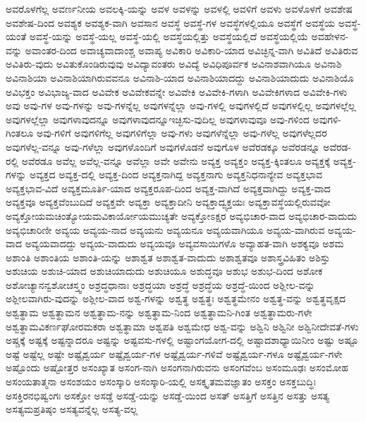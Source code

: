 {ಅವರೊಳಗೆಲ್ಲ
ಅವರ್ಣನೀಯ
ಅವಲಕ್ಕಿ-ಯನ್ನು
ಅವಳ
ಅವಳನ್ನು
ಅವಳಲ್ಲಿ
ಅವಳಿಗೆ
ಅವಳು
ಅವಳೊಳಗೆ
ಅವಶೇಷ
ಅವಶೇಷ-ದಿಂದ
ಅವಶ್ಯಕ
ಅವಶ್ಯಕ-ವಾಗಿ
ಅವಸಾನ
ಅವಸ್ಥೆ
ಅವಸ್ಥೆ-ಗಳ
ಅವಸ್ಥೆಗಳಲ್ಲಿಯೂ
ಅವಸ್ಥೆಗೆ
ಅವಸ್ಥೆಯ
ಅವಸ್ಥೆ-ಯಂತೆ
ಅವಸ್ಥೆ-ಯನ್ನು
ಅವಸ್ಥೆ-ಯಲ್ಲ
ಅವಸ್ಥೆ-ಯಲ್ಲಿ
ಅವಸ್ಥೆಯಲ್ಲಿತ್ತು
ಅವಸ್ಥೆಯಲ್ಲಿದೆ
ಅವಸ್ಥೆಯಲ್ಲಿಯೆ
ಅವಹೇಳನ-ವನ್ನು
ಅವಾಂತರ-ದಿಂದ
ಅವಾಚ್ಯವಾದಾಂಶ್ಚ
ಅವಾಪ್ಯ
ಅವಿಕಾರಿ
ಅವಿಕಾರಿ-ಯಾದ
ಅವಿಚ್ಛಿನ್ನ-ವಾಗಿ
ಅವಿತಿದೆ
ಅವಿತಿರುವ
ಅವಿತಿರು-ವುದು
ಅವಿತುಕೊಂಡಿರುವುವು
ಅವಿದ್ಯಾವಂತರು
ಅವಿದ್ಯೆ
ಅವಿಧಿಪೂರ್ವಕ
ಅವಿನಾಶವಾಗಿಯೂ
ಅವಿನಾಶಿ
ಅವಿನಾಶಿಯಾ
ಅವಿನಾಶಿಯಾಗಿರುವವನೂ
ಅವಿನಾಶಿ-ಯಾದ
ಅವಿನಾಶಿಯಾದದ್ದು
ಅವಿನಾಶಿಯಾದುದು
ಅವಿನಾಶಿಯೊ
ಅವಿಭಕ್ತಂ
ಅವಿಭಾಜ್ಯ-ವಾದ
ಅವಿವೇಕ
ಅವಿವೇಕವನ್ನೇ
ಅವಿವೇಕಿ
ಅವಿವೇಕಿ-ಗಳಾಗಿ
ಅವಿವೇಕಿಗಳಾದ
ಅವಿವೇಕಿ-ಗಳು
ಅವು
ಅವು-ಗಳ
ಅವು-ಗಳನ್ನು
ಅವು-ಗಳನ್ನೆಲ್ಲ
ಅವುಗಳನ್ನೆಲ್ಲಾ
ಅವು-ಗಳಲ್ಲಿ
ಅವುಗಳಲ್ಲಿದೆ
ಅವುಗಳಲ್ಲಿಲ್ಲ
ಅವುಗಳಲ್ಲೆಲ್ಲ
ಅವುಗಳಲ್ಲೆಲ್ಲಾ
ಅವುಗಳಾವುದನ್ನೂ
ಅವುಗಳಾವುದನ್ನೂಇಚ್ಛಿಸು-ವುದಿಲ್ಲ
ಅವುಗಳಾವುವೂ
ಅವು-ಗಳಿಂದ
ಅವುಗಳಿ-ಗಿಂತಲೂ
ಅವು-ಗಳಿಗೆ
ಅವುಗಳಿಗೆಲ್ಲ
ಅವುಗಳಿಗೆಲ್ಲಾ
ಅವು-ಗಳು
ಅವುಗಳೆನ್ನೆಲ್ಲಾ
ಅವು-ಗಳೆಲ್ಲ
ಅವುಗಳೆಲ್ಲದರ
ಅವುಗಳೆಲ್ಲ-ವನ್ನೂ
ಅವು-ಗಳೆಲ್ಲಾ
ಅವುಗಳೊಂದಿಗೆ
ಅವುಗಳೊಡನೆ
ಅವುಗೊಳ
ಅವೆರಡಕ್ಕೂ
ಅವೆರಡನ್ನೂ
ಅವೆರಡ-ರಲ್ಲಿ
ಅವೆರಡೂ
ಅವೆಲ್ಲ
ಅವೆಲ್ಲ-ವನ್ನೂ
ಅವೆಲ್ಲಾ
ಅವೇ
ಅವೇನು
ಅವ್ಯಕ್ತ
ಅವ್ಯಕ್ತಂ
ಅವ್ಯಕ್ತ-ಕ್ಕಿಂತಲೂ
ಅವ್ಯಕ್ತಕ್ಕೆ
ಅವ್ಯಕ್ತ-ಗಳನ್ನು
ಅವ್ಯಕ್ತದ
ಅವ್ಯಕ್ತ-ದಲ್ಲಿ
ಅವ್ಯಕ್ತ-ದಿಂದ
ಅವ್ಯಕ್ತನಾಗಿದ್ದ
ಅವ್ಯಕ್ತನಾಗು
ಅವ್ಯಕ್ತನಿಧನಾನ್ಯೇವ
ಅವ್ಯಕ್ತಭಾವ
ಅವ್ಯಕ್ತಭಾವ-ವಿದೆ
ಅವ್ಯಕ್ತಮೂರ್ತಿ-ಯಾದ
ಅವ್ಯಕ್ತರೂಪ-ದಿಂದ
ಅವ್ಯಕ್ತ-ವಾಗಿದೆ
ಅವ್ಯಕ್ತವಾಗಿದ್ದು
ಅವ್ಯಕ್ತ-ವಾದ
ಅವ್ಯಕ್ತವೂ
ಅವ್ಯಕ್ತವೆಂಬುದಿದೆ
ಅವ್ಯಕ್ತವೇ
ಅವ್ಯಕ್ತಾ
ಅವ್ಯಕ್ತಾದೀನಿ
ಅವ್ಯಕ್ತಾದ್ವ್ಯಕ್ತಯಃ
ಅವ್ಯಕ್ತಾವಸ್ಥೆಯಲ್ಲಿರುವವೋ
ಅವ್ಯಕ್ತೋಯಮಚಿಂತ್ಯೋಯಮವಿಕಾರ್ಯೋಯಮುಚ್ಯತೇ
ಅವ್ಯಕ್ತೋಽಕ್ಷರ
ಅವ್ಯಭಿಚಾರ-ವಾದ
ಅವ್ಯಭಿಚಾರ-ವಾದುದು
ಅವ್ಯಭಿಚಾರಿಣೀ
ಅವ್ಯಯ
ಅವ್ಯಯ-ನಾದ
ಅವ್ಯಯನು
ಅವ್ಯಯನೂ
ಅವ್ಯಯವಾಗಿಯೂ
ಅವ್ಯಯ-ವಾಗಿರುವ
ಅವ್ಯಯ-ವಾದ
ಅವ್ಯಯವಾದದ್ದು
ಅವ್ಯಯ-ವಾದುದು
ಅವ್ಯಯವೂ
ಅವ್ಯವಸಾಯಿಗಳೊ
ಅವ್ಯಾಹತ-ವಾಗಿ
ಅಶಕ್ಯವೂ
ಅಶಮ
ಅಶಾಂತಿ
ಅಶಾಂತಿಯ
ಅಶಾಂತಿ-ಯನ್ನು
ಅಶಾಶ್ವತ
ಅಶಾಶ್ವತ-ವಾದುದು
ಅಶಾಶ್ವತವೂ
ಅಶಾಸ್ತ್ರವಿಹಿತಂ
ಅಶಿಸ್ತು
ಅಶುಚಿಯ
ಅಶುಚಿ-ಯಾದ
ಅಶುಚಿಯಾದುದು
ಅಶುಚಿಯೂ
ಅಶುದ್ಧವೂ
ಅಶುಭ
ಅಶುಭ-ದಿಂದ
ಅಶೋಕ
ಅಶೋಚ್ಯಾನನ್ವಶೋಚಸ್ತ್ವಂ
ಅಶ್ರದ್ಧಧಾನಾಃ
ಅಶ್ರದ್ಧಯಾ
ಅಶ್ರದ್ಧೆ
ಅಶ್ರದ್ಧೆಯ
ಅಶ್ರದ್ಧೆ-ಯಿಂದ
ಅಶ್ಲೀಲ-ವನ್ನು
ಅಶ್ಲೀಲವಾಗಿರು-ವುದನ್ನು
ಅಶ್ಲೀಲ-ವಾದ
ಅಶ್ವ-ಗಳನ್ನು
ಅಶ್ವತ್ಥ
ಅಶ್ವತ್ಥಃ
ಅಶ್ವತ್ಥಮೇನಂ
ಅಶ್ವತ್ಥ-ವನ್ನು
ಅಶ್ವತ್ಥವೃಕ್ಷದ
ಅಶ್ವತ್ಥಾಮ
ಅಶ್ವತ್ಥಾಮನ
ಅಶ್ವತ್ಥಾಮ-ನನ್ನು
ಅಶ್ವತ್ಥಾಮ-ನಿಂದ
ಅಶ್ವತ್ಥಾಮನಿ-ಗಿಂತ
ಅಶ್ವತ್ಥಾಮರು-ಗಳೇ
ಅಶ್ವತ್ಥಾಮವಿಕರ್ಣಘೋರಮಕರಾ
ಅಶ್ವತ್ಥಾಮಾ
ಅಶ್ವಪತಿ
ಅಶ್ವಮೇಧ
ಅಶ್ವ-ವನ್ನು
ಅಶ್ವಿನಿ
ಅಶ್ವಿನೀ
ಅಶ್ವಿನೀದೇವತೆ-ಗಳು
ಅಷ್ಚಕ್ಕೆ
ಅಷ್ಟಕ್ಕೆ
ಅಷ್ಟನ್ನಾದರೂ
ಅಷ್ಟನ್ನು
ಅಷ್ಟವಸು-ಗಳಲ್ಲಿ
ಅಷ್ಟಾಂಗಯೋಗ-ದಲ್ಲಿ
ಅಷ್ಟಾದಶಾಧ್ಯಾಯಿನೀಂ
ಅಷ್ಟು
ಅಷ್ಟೂ
ಅಷ್ಟೆ
ಅಷ್ಟೆಲ್ಲ
ಅಷ್ಟೇ
ಅಷ್ಟೈಶ್ವರ್ಯ
ಅಷ್ಟೈಶ್ವರ್ಯ-ಗಳ
ಅಷ್ಟೈಶ್ವರ್ಯ-ಗಳಿವೆ
ಅಷ್ಟೈಶ್ವರ್ಯ-ಗಳೂ
ಅಷ್ಟೈಶ್ವರ್ಯ-ಗಳೇ
ಅಷ್ಟೊಂದು
ಅಷ್ಟೋತ್ತರ
ಅಸಂಖ್ಯಾತ
ಅಸಂಗ-ನಾಗಿ
ಅಸಂಗನಾಗಿರುವನು
ಅಸಂಗವೆಂಬ
ಅಸಂಮೂಢಃ
ಅಸಂಮೋಹ
ಅಸಂಯತಾತ್ಮನಾ
ಅಸಂಶಯಂ
ಅಸಂಸ್ಕಾರಿ
ಅಸಂಸ್ಕಾರಿ-ಯಲ್ಲಿ
ಅಸಕ್ಕೃತಮವಜ್ಞಾತಂ
ಅಸಕ್ತಂ
ಅಸಕ್ತಬುದ್ಧಿಃ
ಅಸಕ್ತಿರನಭಿಷ್ವಂಗಃ
ಅಸಕ್ತೋ
ಅಸಡ್ಡೆ
ಅಸಡ್ಡೆ-ಯನ್ನು
ಅಸಡ್ಡೆ-ಯಿಂದ
ಅಸತ್
ಅಸತ್ತಿಗೆ
ಅಸತ್ತಿನ
ಅಸತ್ತು
ಅಸತ್ಯ
ಅಸತ್ಯಮಪ್ರತಿಷ್ಠಂ
ಅಸತ್ಯವನ್ನೆಲ್ಲ
ಅಸತ್ಯ-ವಲ್ಲ
}
